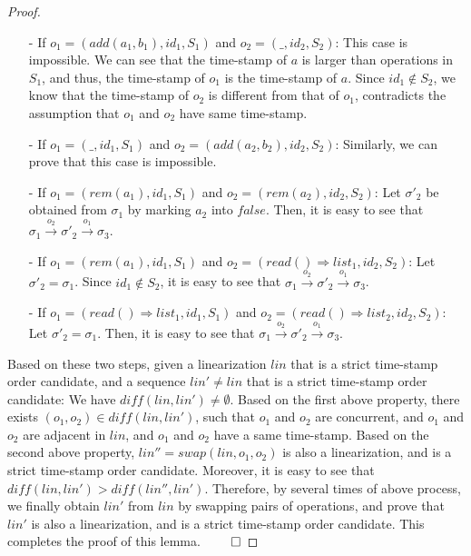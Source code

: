 {\begin {proof}
\begin{itemize}
    \begin{itemize}
    \setlength{\itemsep}{0.5pt}
    \item[-] If $o_1 = (\mathit{add}(a_1,b_1),\mathit{id}_1,S_1)$ and $o_2 = (\_,\mathit{id}_2,S_2)$: This case is impossible. We can see that the time-stamp of $a$ is larger than operations in $S_1$, and thus, the time-stamp of $o_1$ is the time-stamp of $a$. Since $\mathit{id}_1 \notin S_2$, we know that the time-stamp of $o_2$ is different from that of $o_1$, contradicts the assumption that $o_1$ and $o_2$ have same time-stamp.

    \item[-] If $o_1 = (\_,\mathit{id}_1,S_1)$ and $o_2 = (\mathit{add}(a_2,b_2),\mathit{id}_2,S_2)$: Similarly, we can prove that this case is impossible.

    \item[-] If $o_1 = (\mathit{rem}(a_1),\mathit{id}_1,S_1)$ and $o_2 = (\mathit{rem}(a_2),\mathit{id}_2,S_2)$: Let $\sigma'_2$ be obtained from $\sigma_1$ by marking $a_2$ into $\mathit{false}$. Then, it is easy to see that $\sigma_1 {\xrightarrow{o_2}} \sigma'_2 {\xrightarrow{o_1}} \sigma_3$.

    \item[-] If $o_1 = (\mathit{rem}(a_1),\mathit{id}_1,S_1)$ and $o_2 = (\mathit{read}() \Rightarrow \mathit{list}_1,\mathit{id}_2,S_2)$: Let $\sigma'_2 = \sigma_1$. Since $\mathit{id}_1 \notin S_2$, it is easy to see that $\sigma_1 {\xrightarrow{o_2}} \sigma'_2 {\xrightarrow{o_1}} \sigma_3$.

    \item[-] If $o_1 = (\mathit{read}() \Rightarrow \mathit{list}_1,\mathit{id}_1,S_1)$ and $o_2 = (\mathit{read}() \Rightarrow \mathit{list}_2,\mathit{id}_2,S_2)$: Let $\sigma'_2 = \sigma_1$. Then, it is easy to see that $\sigma_1 {\xrightarrow{o_2}} \sigma'_2 {\xrightarrow{o_1}} \sigma_3$.
    \end{itemize}
\end{itemize}

Based on these two steps, given a linearization $\mathit{lin}$ that is a strict time-stamp order candidate, and a sequence $\mathit{lin}' \neq \mathit{lin}$ that is a strict time-stamp order candidate: We have $\mathit{diff}(\mathit{lin},\mathit{lin}') \neq \emptyset$. Based on the first above property, there exists $(o_1,o_2) \in \mathit{diff}(\mathit{lin},\mathit{lin}')$, such that $o_1$ and $o_2$ are concurrent, and $o_1$ and $o_2$ are adjacent in $\mathit{lin}$, and $o_1$ and $o_2$ have a same time-stamp. Based on the second above property, $\mathit{lin}'' = \mathit{swap}(\mathit{lin},o_1,o_2)$ is also a linearization, and is a strict time-stamp order candidate. Moreover, it is easy to see that $\mathit{diff}(\mathit{lin},\mathit{lin}') > \mathit{diff}(\mathit{lin}'',\mathit{lin}')$. Therefore, by several times of above process, we finally obtain $\mathit{lin}'$ from $\mathit{lin}$ by swapping pairs of operations, and prove that $\mathit{lin}'$ is also a linearization, and is a strict time-stamp order candidate. This completes the proof of this lemma. $\qed$
\end {proof}


}
